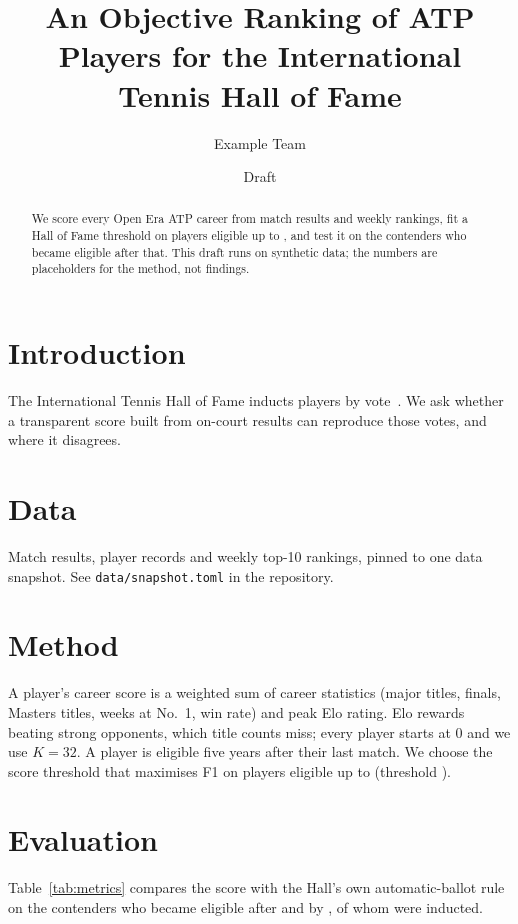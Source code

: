 \documentclass[11pt]{article}
\title{An Objective Ranking of ATP Players for the International Tennis Hall of Fame}
\author{Example Team}
\date{Draft}
\begin{document}
\maketitle

\begin{abstract}
We score every Open Era ATP career from match results and weekly rankings,
fit a Hall of Fame threshold on players eligible up to \SplitYear, and test it
on the \TestPlayers{} contenders who became eligible after that. This draft runs
on synthetic data; the numbers are placeholders for the method, not findings.
\end{abstract}

\section{Introduction}
The International Tennis Hall of Fame inducts players by vote~\citep{ithf}.
We ask whether a transparent score built from on-court results can reproduce
those votes, and where it disagrees.

\section{Data}
Match results, player records and weekly top-10 rankings, pinned to one data
snapshot. See \texttt{data/snapshot.toml} in the repository.

\section{Method}
A player's career score is a weighted sum of career statistics (major titles,
finals, Masters titles, weeks at No.~1, win rate) and peak Elo rating. Elo
rewards beating strong opponents, which title counts miss; every player starts
at 0 and we use $K=32$. A player is eligible five
years after their last match. We choose the score threshold that maximises F1
on players eligible up to \SplitYear{} (threshold \Threshold).

\section{Evaluation}
Table~\ref{tab:metrics} compares the score with the Hall's own automatic-ballot
rule on the \TestPlayers{} contenders who became eligible after \SplitYear{} and by \AsOf{}, of
whom \TestInducted{} were inducted.

\begin{table}[h]
\centering
\MetricsTable
\caption{Agreement with real inductions on held-out years.}
\label{tab:metrics}
\end{table}

\begin{table}[h]
\centering
\small
\TopTable
\caption{The fifteen highest career scores.}
\label{tab:top}
\end{table}



\end{document}
